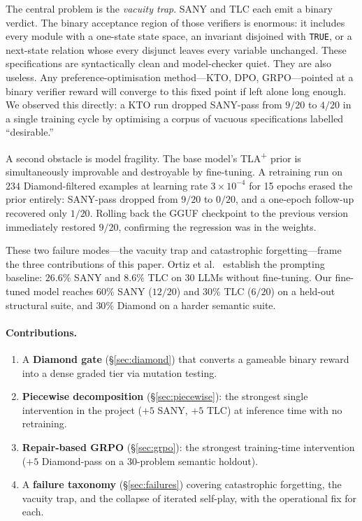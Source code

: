 \documentclass[10pt,twocolumn]{article}
\begin{document}
The central problem is the \emph{vacuity trap}.
SANY and TLC each emit a binary verdict.
The binary acceptance region of those verifiers is enormous: it includes every
module with a one-state state space, an invariant disjoined with
\texttt{TRUE}, or a next-state relation whose every disjunct leaves every
variable unchanged.
These specifications are syntactically clean and model-checker quiet.
They are also useless.
Any preference-optimisation method---KTO, DPO, GRPO---pointed at a binary
verifier reward will converge to this fixed point if left alone long enough.
We observed this directly: a KTO run dropped SANY-pass from $9/20$ to
$4/20$ in a single training cycle by optimising a corpus of vacuous
specifications labelled ``desirable.''

A second obstacle is model fragility.
The base model's TLA\textsuperscript{+} prior is simultaneously improvable
and destroyable by fine-tuning.
A retraining run on $234$ Diamond-filtered examples at learning rate
$3\!\times\!10^{-4}$ for 15 epochs erased the prior entirely: SANY-pass
dropped from $9/20$ to $0/20$, and a one-epoch follow-up recovered only $1/20$.
Rolling back the GGUF checkpoint to the previous version immediately restored
$9/20$, confirming the regression was in the weights.

These two failure modes---the vacuity trap and catastrophic forgetting---frame
the three contributions of this paper.
Ortiz et al.~\cite{ortiz2026formallm} establish the prompting baseline:
$26.6\%$ SANY and $8.6\%$ TLC on $30$ LLMs without fine-tuning.
Our fine-tuned model reaches $60\%$ SANY ($12/20$) and $30\%$ TLC ($6/20$)
on a held-out structural suite, and $30\%$ Diamond on a harder semantic suite.

\paragraph{Contributions.}
\begin{enumerate}[leftmargin=1.4em,topsep=2pt,itemsep=1pt]
\item A \textbf{Diamond gate} (\S\ref{sec:diamond}) that converts a gameable
  binary reward into a dense graded tier via mutation testing.
\item \textbf{Piecewise decomposition} (\S\ref{sec:piecewise}): the strongest
  single intervention in the project ($+5$ SANY, $+5$ TLC) at inference time
  with no retraining.
\item \textbf{Repair-based GRPO} (\S\ref{sec:grpo}): the strongest training-time
  intervention ($+5$ Diamond-pass on a 30-problem semantic holdout).
\item A \textbf{failure taxonomy} (\S\ref{sec:failures}) covering catastrophic
  forgetting, the vacuity trap, and the collapse of iterated self-play, with
  the operational fix for each.
\end{enumerate}
\end{document}
